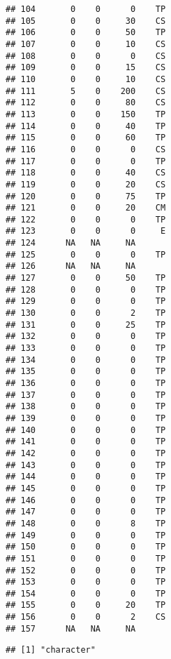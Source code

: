 \documentclass[
]{article}
\newenvironment{Shaded}{\begin{snugshade}}{\end{snugshade}}
\newcommand{\FunctionTok}[1]{\textcolor[rgb]{0.00,0.00,0.00}{#1}}
\newcommand{\NormalTok}[1]{#1}
\newcommand{\SpecialCharTok}[1]{\textcolor[rgb]{0.00,0.00,0.00}{#1}}
\begin{document}
\begin{verbatim}
## 104       0    0      0    TP
## 105       0    0     30    CS
## 106       0    0     50    TP
## 107       0    0     10    CS
## 108       0    0      0    CS
## 109       0    0     15    CS
## 110       0    0     10    CS
## 111       5    0    200    CS
## 112       0    0     80    CS
## 113       0    0    150    TP
## 114       0    0     40    TP
## 115       0    0     60    TP
## 116       0    0      0    CS
## 117       0    0      0    TP
## 118       0    0     40    CS
## 119       0    0     20    CS
## 120       0    0     75    TP
## 121       0    0     20    CM
## 122       0    0      0    TP
## 123       0    0      0     E
## 124      NA   NA     NA      
## 125       0    0      0    TP
## 126      NA   NA     NA      
## 127       0    0     50    TP
## 128       0    0      0    TP
## 129       0    0      0    TP
## 130       0    0      2    TP
## 131       0    0     25    TP
## 132       0    0      0    TP
## 133       0    0      0    TP
## 134       0    0      0    TP
## 135       0    0      0    TP
## 136       0    0      0    TP
## 137       0    0      0    TP
## 138       0    0      0    TP
## 139       0    0      0    TP
## 140       0    0      0    TP
## 141       0    0      0    TP
## 142       0    0      0    TP
## 143       0    0      0    TP
## 144       0    0      0    TP
## 145       0    0      0    TP
## 146       0    0      0    TP
## 147       0    0      0    TP
## 148       0    0      8    TP
## 149       0    0      0    TP
## 150       0    0      0    TP
## 151       0    0      0    TP
## 152       0    0      0    TP
## 153       0    0      0    TP
## 154       0    0      0    TP
## 155       0    0     20    TP
## 156       0    0      2    CS
## 157      NA   NA     NA
\end{verbatim}

\begin{Shaded}
\end{Shaded}

\begin{verbatim}
## [1] "character"
\end{verbatim}

\begin{Shaded}
\end{Shaded}
\end{document}
